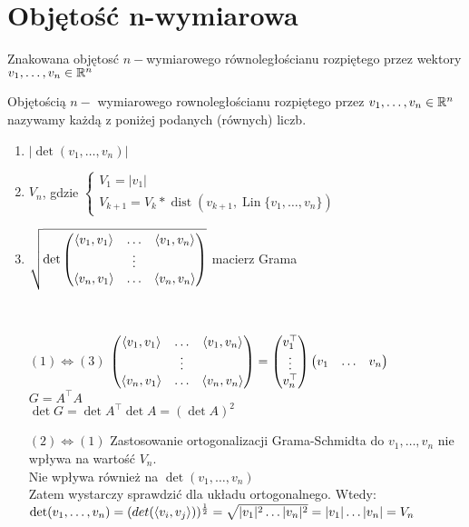 \section{Objętość n-wymiarowa}
Znakowana objętosć $n-$wymiarowego równoległościanu rozpiętego przez wektory 
$v_1,\ldots,v_n \in \mathbb{R}^n$
\begin{df}[tw] 
    Objętością $n-$ wymiarowego rownoległościanu rozpiętego przez $v_1,\ldots,v_n \in \mathbb{R}^n$ 
    nazywamy każdą z poniżej podanych (równych) liczb. 
    \begin{enumerate}[(1)] 
        \item $|\det(v_1,\ldots,v_n)|$
        \item $V_n$, gdzie $\begin{cases} V_1 = |v_1| \\ 
                V_{k+1} = V_k * \operatorname{dist}
            (v_{k+1},\operatorname{Lin} \{v_1,\ldots,v_n \}) \end{cases}$
        \item $\sqrt{\det\begin{pmatrix} \left\langle v_1, v_1 \right\rangle&\ldots&\left\langle v_1, v_n \right\rangle \\ 
                    & \vdots & \\ 
            \left\langle v_n, v_1 \right\rangle & \ldots & \left\langle v_n, v_n \right\rangle \end{pmatrix}}$ macierz Grama
    \end{enumerate} 
\end{df} 
\begin{dd} ~
    \begin{itemize} 
    \item[$(1) \Leftrightarrow (3)$] 
        $\begin{pmatrix} \left\langle v_1, v_1 \right\rangle & \ldots & \left\langle v_1, v_n \right\rangle \\ 
            & \vdots & \\ 
        \left\langle v_n, v_1 \right\rangle & \ldots & \left\langle v_n, v_n \right\rangle \end{pmatrix} = 
        \begin{pmatrix} v_1^\top \\ \vdots \\ v_n^\top \end{pmatrix} 
        \begin{pmatrix} v_1 & \ldots & v_n \end{pmatrix} $ \\ 
        $G = A^\top A$ \\ 
        $\det G = \det A^\top \det A = (\det A)^2$
    \item[$(2) \Leftrightarrow (1)$] Zastosowanie ortogonalizacji Grama-Schmidta do $v_1,
        \ldots,v_n$ nie wpływa na wartość $V_n$.  \\ 
    Nie wpływa również na $\det(v_1,\ldots,v_n)$  \\ 
    Zatem wystarczy sprawdzić dla układu ortogonalnego. Wtedy: 
    $\det(v_1,\ldots,v_n) = (det(\left\langle v_i, v_j \right\rangle))^{\frac{1}{2}} = \\ 
    \sqrt{|v_1|^2\ldots|v_n|^2} = |v_1|\ldots|v_n| = V_n$
    \end{itemize} 
\end{dd} 
